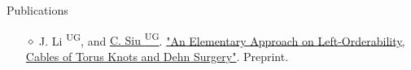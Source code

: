 \documentclass{resume} %
\begin{document}
\begin{rSection}{Publications}
\begin{itemize}[noitemsep]
    \item[$\diamond$] J. Li \textsuperscript{UG}, and \underline{C. Siu \textsuperscript{UG}}. \href{https://arxiv.org/abs/1610.00898}{"An Elementary Approach on Left-Orderability, Cables of Torus Knots and Dehn Surgery"}. Preprint.
\end{itemize}





\end{rSection}
\end{document}
